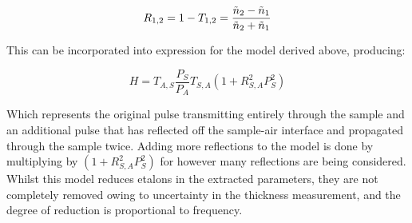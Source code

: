 \begin{equation}
R_{1,2} = 1 - T_{1,2} = \frac{\Tilde{n}_2-\Tilde{n}_1}{\Tilde{n}_2+\Tilde{n}_1}
\end{equation}

This can be incorporated into expression for the model derived above, producing:

\begin{equation}
H = T_{A,S} \frac{P_S}{P_A} T_{S,A} (1+R_{S,A}^2 P_S^2)
\end{equation}

Which represents the original pulse transmitting entirely through the sample and an additional pulse that has reflected off the sample-air interface and propagated through the sample twice. Adding more reflections to the model is done by multiplying by \((1+R_{S,A}^2 P_S^2)\) for however many reflections are being considered. Whilst this model reduces etalons in the extracted parameters, they are not completely removed owing to uncertainty in the thickness measurement, and the degree of reduction is proportional to frequency. 


